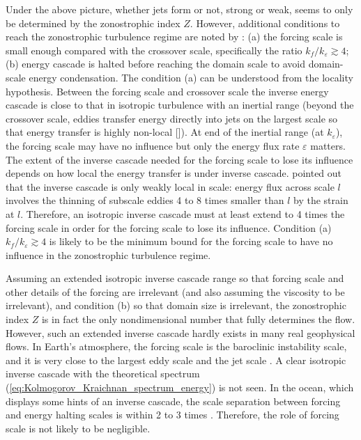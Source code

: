 \documentclass{ametsoc}
\begin{document}
Under the above picture, whether jets form or not, strong or weak,
seems to only be determined by the zonostrophic index $Z$. However,
additional conditions to reach the zonostrophic turbulence regime
are noted by \citet{Sukoriansky2007}: (a) the forcing scale is small
enough compared with the crossover scale, specifically the ratio $k_{f}/k_{\varepsilon}\apprge4$;
(b) energy cascade is halted before reaching the domain scale to avoid
domain-scale energy condensation. The condition (a) can be understood
from the locality hypothesis. Between the forcing scale and crossover
scale the inverse energy cascade is close to that in isotropic
turbulence with an inertial range (beyond the crossover scale, eddies
transfer energy directly into jets on the largest scale so that energy
transfer is highly non-local {[}\citealt{Manz2009}{]}). At end of
the inertial range (at $k_{\varepsilon}$), the forcing scale may
have no influence but only the energy flux rate $\varepsilon$ matters.
The extent of the inverse cascade needed for the forcing scale to lose
its influence depends on how local the energy transfer is under inverse
cascade. \citet{Chen2006} pointed out that the inverse cascade is
only weakly local in scale: energy flux across scale $l$ involves
the thinning of subscale eddies 4 to 8 times smaller than $l$ by
the strain at $l$. Therefore, an isotropic inverse cascade must at
least extend to 4 times the forcing scale in order for the forcing
scale to lose its influence. Condition (a) $k_{f}/k_{\varepsilon}\apprge4$
is likely to be the minimum bound for the forcing scale to have no
influence in the zonostrophic turbulence regime.

Assuming an extended isotropic inverse cascade range so that forcing
scale and other details of the forcing are irrelevant (and also assuming
the viscosity to be irrelevant), and condition (b) so that domain
size is irrelevant, the zonostrophic index $Z$ is in fact the only
nondimensional number that fully determines the flow. However, such
an extended inverse cascade hardly exists in many real geophysical
flows. In Earth's atmosphere, the forcing scale is the baroclinic
instability scale, and it is very close to the largest eddy scale
and the jet scale \citep{Schneider2006,Merlis2009}. A clear isotropic
inverse cascade with the theoretical spectrum (\ref{eq:Kolmogorov_Kraichnan_spectrum_energy})
is not seen. In the ocean, which displays some hints of an inverse
cascade, the scale separation between forcing and energy halting scales
is within 2 to 3 times \citep{Tulloch2011}. Therefore, the role of
forcing scale is not likely to be negligible.
\end{document}
